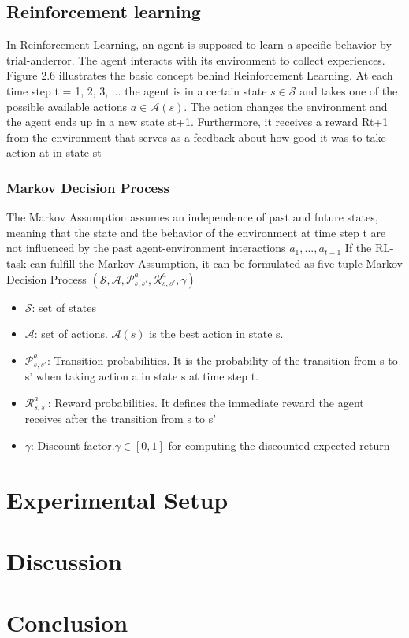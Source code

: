 \documentclass[
a4paper, 
12pt,
grayscalebody, %
abstract=on,
twoside, BCOR10mm, 12pt, DIV13,headinclude, footexclude, final, abstracton, openright
]{ibireprt}
\numberwithin{equation}{chapter}
\numberwithin{table}{chapter}
\numberwithin{figure}{chapter}
\numberwithin{algorithm}{chapter}
\numberwithin{example}{chapter}
\numberwithin{example}{chapter}
\begin{document}
	\section{Reinforcement learning}
	In Reinforcement Learning, an agent is supposed to learn a specific behavior by trial-anderror. The agent interacts with its environment to collect experiences. Figure 2.6 illustrates the basic concept behind Reinforcement Learning. At each time step t = 1, 2, 3, ...
	the agent is in a certain state $s \in \mathcal{S}$ and takes one of the possible available actions
	$a \in \mathcal{A}(s)$. The action changes the environment and the agent ends up in a new state
	st+1. Furthermore, it receives a reward Rt+1 from the environment that serves as a feedback about how good it was to take action at
	in state st
	
	\subsection{Markov Decision Process}
	The Markov Assumption assumes an independence of past and future states, meaning
	that the state and the behavior of the environment at time step t are not 
	influenced by the past agent-environment interactions
	$a_1, ..., a_{t-1}$
	If the RL-task can fulfill the Markov Assumption, it can be formulated as five-tuple Markov Decision Process $(\mathcal{S},\mathcal{A}, \mathcal{P}_{s,s'}^a, \mathcal{R}_{s,s'}^a, \gamma)$
	
	\begin{itemize}
		\item $\mathcal{S}$: set of states
		\item $\mathcal{A}$: set of actions. $\mathcal{A}(s)$ is the best action in state s.
		\item $\mathcal{P}_{s,s'}^a$: Transition probabilities. It is the probability of the	transition from s to s' when taking action a in state s at time step t.
		\item $\mathcal{R}_{s,s'}^a$: Reward probabilities. It defines the immediate reward the agent receives after the transition from s to s'
		\item  $\gamma$: Discount factor.$ \gamma \in [0, 1]$ for computing the discounted expected return
	\end{itemize}
	
	\chapter{Experimental Setup}
			
	\chapter{Discussion}
		
	
	\chapter{Conclusion}
	
\end{document}
